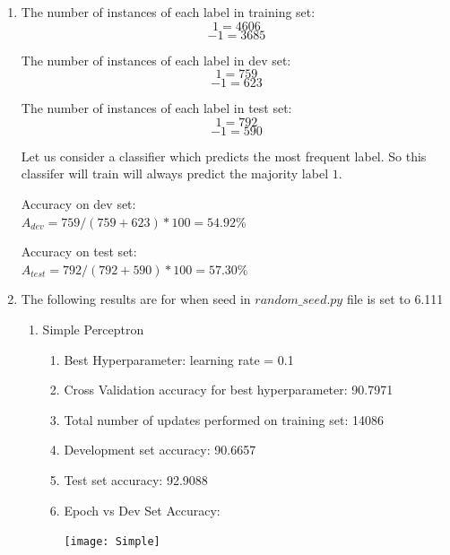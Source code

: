 \begin{enumerate}
	\item
	The number of instances of each label in training set:
	$$1 	= 4606 $$
	$$-1 = 3685 $$
	
	The number of instances of each label in dev set:
	$$1 	= 759 $$
	$$-1 = 623 $$
	
	The number of instances of each label in test set:
	$$1 	= 792 $$
	$$-1 = 590 $$
	
	Let us consider a classifier which predicts the most frequent label. So this classifer will train will always predict the majority label $1$.
	
	Accuracy on dev set: \\
	$A_{dev} = 759/(759+623)*100 = 54.92 \%$
	
	Accuracy on test set: \\
	$A_{test} = 792/(792+590)*100 = 57.30 \%$
	
	\item
	The following results are for when seed in $random\_seed.py$ file is set to 6.111
	\begin{enumerate}
		\item Simple Perceptron
			\begin{enumerate}
				\item Best Hyperparameter: learning rate = 0.1
				\item Cross Validation accuracy for best hyperparameter: 90.7971
				\item Total number of updates performed on training set: 14086
				\item Development set accuracy: 90.6657
				\item Test set accuracy: 92.9088
				\item Epoch vs Dev Set Accuracy:
					\begin{center}
						\texttt{[image: Simple]}
					\end{center}
			\end{enumerate}
			

\end{enumerate}
\end{enumerate}
